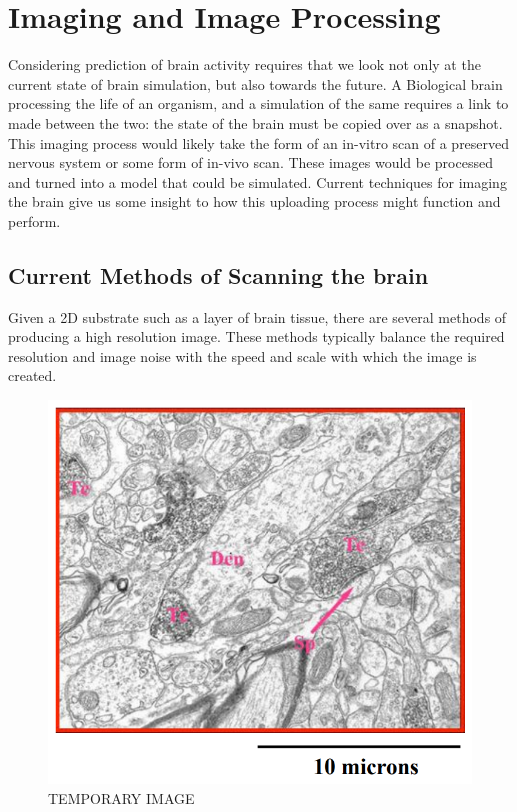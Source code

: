 \section{Imaging and Image Processing}

Considering prediction of brain activity requires that we look not only at the
current state of brain simulation, but also towards the future. A Biological
brain processing the life of an organism, and a simulation of the same requires
a link to made between the two: the state of the brain must be copied over as a
snapshot. This imaging process would likely take the form of an in-vitro scan of
a preserved nervous system or some form of in-vivo scan. These images would be
processed and turned into a model that could be simulated. Current techniques for imaging the brain give us some insight to how this
uploading process might function and perform.

\subsection{Current Methods of Scanning the brain}

Given a 2D substrate such as a layer of brain
tissue, there are several methods of producing a high resolution image. These
methods typically balance the required resolution and image noise with the speed
and scale with which the image is created.

\begin{figure}[h]
    \centering
    \includegraphics{figures/graphs/scaleexample.png}
    {TEMPORARY IMAGE}
    \label{scaleexample}
\end{figure}
\vspace{1ex}

